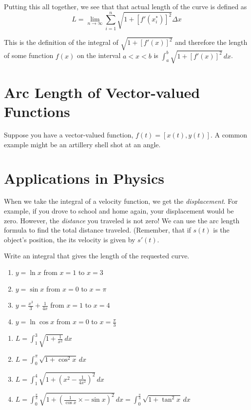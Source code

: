 Putting this all together, we see that that actual length of the 
curve is defined as $$L = \lim_{n \to \infty}\sum_{i=1}^n \sqrt{1+
[f'(x_i^{\text{*}})]^2}\Delta x$$

This is the definition of the integral of $\sqrt{1+[f'(x)]^2}$ and 
therefore the length of some function $f(x)$ on the interval $a < x <b$ 
is $\int_a^b \sqrt{1 + [f'(x)]^2}\,dx$.

\section{Arc Length of Vector-valued Functions}
Suppose you have a vector-valued function, $f(t) = [x(t), y(t)]$. A common example might be an artillery shell shot at an angle.

\section{Applications in Physics}
When we take the integral of a velocity function, we get the \textit{displacement}. For example, if you drove to school and home again, your displacement would be zero. However, the \textit{distance} you traveled is not zero! We can use the arc length formula to find the total distance traveled. (Remember, that if $s(t)$ is the object's position, the its velocity is given by $s'(t)$.

\begin{Exercise}[label=length1]
Write an integral that gives the length of the requested curve.
	\begin{enumerate}
	\item $y = \ln{x}$ from $x = 1$ to $x = 3$
	\item $y = \sin{x}$ from $x = 0$ to $x = \pi$
	\item $y = \frac{x^3}{3} + \frac{1}{4x}$ from $x = 1$ to $x = 4$
	\item $y = \ln{\cos{x}}$ from $x = 0$ to $x = \frac{\pi}{3}$
	\end{enumerate}	 
\end{Exercise}

\begin{Answer}[ref=length1]
	\begin{enumerate}
	\item $L = \int_{1}^{3} \sqrt{1 + \frac{1}{x^2}}\,dx$
	\item $L = \int_{0}^{\pi} \sqrt{1 + \cos^2{x}}\,dx$
	\item $L = \int_{1}^{4} \sqrt{1 + (x^2-\frac{1}{4x^2})^2}\,dx$
	\item $L = \int_{0}^{\frac{\pi}{3}} \sqrt{1 + (\frac{1}{\cos{x}} 
	\times - \sin{x})^2}\,dx = \int_{0}^{\frac{\pi}{3}} \sqrt{1 + 
	\tan^2{x}}\,dx$
	\end{enumerate}
\end{Answer}


